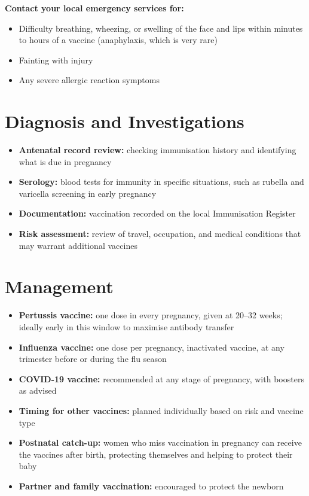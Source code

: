 \textbf{Contact your local emergency services for:}
\begin{itemize}
    \item Difficulty breathing, wheezing, or swelling of the face and lips within minutes to hours of a vaccine (anaphylaxis, which is very rare)
    \item Fainting with injury
    \item Any severe allergic reaction symptoms
\end{itemize}

\section*{Diagnosis and Investigations}
\begin{itemize}
    \item \textbf{Antenatal record review:} checking immunisation history and identifying what is due in pregnancy
    \item \textbf{Serology:} blood tests for immunity in specific situations, such as rubella and varicella screening in early pregnancy
    \item \textbf{Documentation:} vaccination recorded on the local Immunisation Register
    \item \textbf{Risk assessment:} review of travel, occupation, and medical conditions that may warrant additional vaccines
\end{itemize}

\section*{Management}
\begin{itemize}
    \item \textbf{Pertussis vaccine:} one dose in every pregnancy, given at 20--32 weeks; ideally early in this window to maximise antibody transfer
    \item \textbf{Influenza vaccine:} one dose per pregnancy, inactivated vaccine, at any trimester before or during the flu season
    \item \textbf{COVID-19 vaccine:} recommended at any stage of pregnancy, with boosters as advised
    \item \textbf{Timing for other vaccines:} planned individually based on risk and vaccine type
    \item \textbf{Postnatal catch-up:} women who miss vaccination in pregnancy can receive the vaccines after birth, protecting themselves and helping to protect their baby
    \item \textbf{Partner and family vaccination:} encouraged to protect the newborn
\end{itemize}

